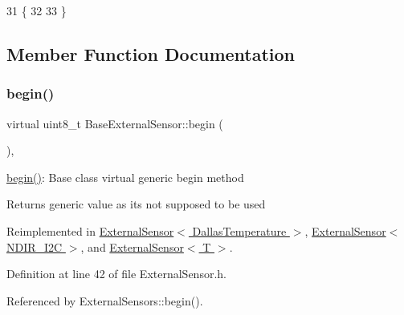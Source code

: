 \begin{DoxyCode}
31     \{
32     
33     \}
\end{DoxyCode}


\subsection{Member Function Documentation}
\mbox{\label{classBaseExternalSensor_a87d132803d4f4fdd4e66332809f0c9a0}} 
\subsubsection{\texorpdfstring{begin()}{begin()}}
{\footnotesize\ttfamily virtual uint8\+\_\+t Base\+External\+Sensor\+::begin (\begin{DoxyParamCaption}{ }\end{DoxyParamCaption})\hspace{0.3cm}{\ttfamily [inline]}, {\ttfamily [virtual]}}

\hyperlink{classBaseExternalSensor_a87d132803d4f4fdd4e66332809f0c9a0}{begin()}\+: Base class virtual generic begin method

\begin{DoxyReturn}{Returns}
generic value as it\textquotesingle{}s not supposed to be used 
\end{DoxyReturn}


Reimplemented in \hyperlink{classExternalSensor_3_01DallasTemperature_01_4_ac5275129b05e2ff8df45d5b222a661d9}{External\+Sensor$<$ Dallas\+Temperature $>$}, \hyperlink{classExternalSensor_3_01NDIR__I2C_01_4_ac6f3614d94968ef0cc11b2b4d69cef03}{External\+Sensor$<$ N\+D\+I\+R\+\_\+\+I2\+C $>$}, and \hyperlink{classExternalSensor_ab6fe1379d55b656a048e0fba1e0a32e6}{External\+Sensor$<$ T $>$}.



Definition at line 42 of file External\+Sensor.\+h.



Referenced by External\+Sensors\+::begin().


